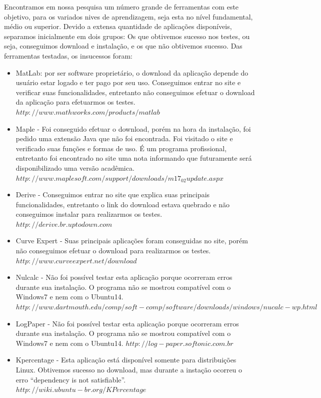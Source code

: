 \documentclass[12pt,a4paper]{article}
\begin{document}
Encontramos em nossa pesquisa um número grande de ferramentas com este objetivo, para os variados nives de aprendizagem, seja esta no nível fundamental, médio ou superior.   Devido a  extensa quantidade de aplicações disponíveis, separamos inicialmente em dois grupos: Os que  obtivemos sucesso nos testes, ou seja, conseguimos download e  instalação, e os que não obtivemos sucesso.
Das ferramentas testadas, os insucessos foram:
        \begin{itemize}

            \item MatLab: por ser software proprietário, o download da aplicação depende do usuário estar logado e ter pago por seu uso.  Conseguimos entrar no site e verificar suas funcionalidades, entretanto não conseguimos efetuar o download da aplicação para efetuarmos os testes. $http://www.mathworks.com/products/matlab$
 
            \item Maple - Foi conseguido efetuar o download, porém na hora da instalação, foi pedido uma extensão Java que não foi encontrada. Foi visitado o site e verificado suas funções e formas de uso. É um programa profissional, entretanto foi encontrado no site uma nota informando que futuramente será disponibilizado uma versão acadêmica. $http://www.maplesoft.com/support/downloads/m17_02update.aspx$
            
            \item Derive - Conseguimos entrar no site que explica suas principais funcionalidades, entretanto o link do download estava quebrado e não conseguimos instalar para realizarmos os testes. $http://derive.br.uptodown.com$
            
            \item Curve Expert - Suas principais aplicações foram conseguidas no site, porém não conseguimos efetuar o download para realizarmos os testes. $http://www.curveexpert.net/download$
            
            \item Nulcalc - Não foi possível testar esta aplicação porque ocorreram erros durante sua instalação. O programa não se mostrou compatível com o Windows7 e nem com o Ubuntu14. $http://www.dartmouth.edu/comp/soft-comp/software/downloads/windows/nucalc-wp.html$
            
            \item LogPaper - Não foi possível testar esta aplicação porque ocorreram erros durante sua instalação. O programa não se mostrou compatível com o Windows7 e nem com o Ubuntu14. $http://log-paper.softonic.com.br$
            
            \item Kpercentage - Esta aplicação está disponível somente para distribuições Linux. Obtivemos sucesso no download, mas durante a instação ocorreu o erro “dependency is not satisfiable”. $http://wiki.ubuntu-br.org/KPercentage$
        \end{itemize}
        
\end{document}
